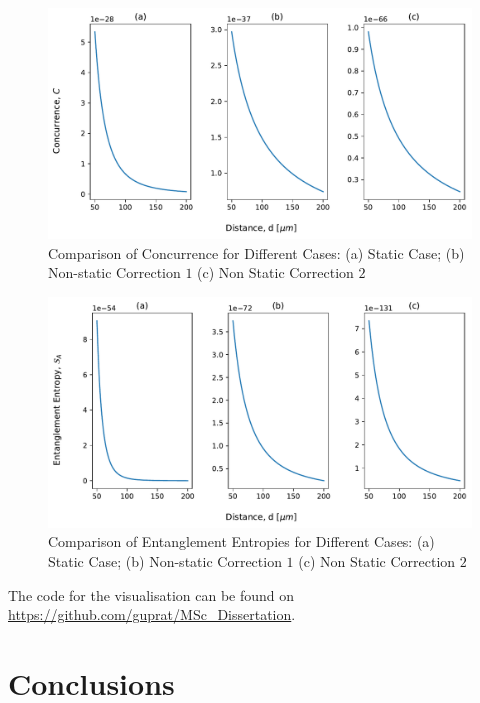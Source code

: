 \documentclass[12pt,a4paper]{report}
\theoremstyle{plain}
\theoremstyle{definition}
\theoremstyle{remark}
\begin{document}
\begin{figure}[htb]
    \centering
    \includegraphics[width=15cm]{ConcCases.pdf}
    \caption{Comparison of Concurrence for Different Cases:  (a) Static Case; (b) Non-static Correction $1$ (c) Non Static Correction $2$}
    \label{fig:Concurrence}
\end{figure}
\begin{figure}[htb]
    \centering
    \includegraphics[width=15cm]{EECases.pdf}
    \caption{Comparison of Entanglement Entropies for Different Cases:  (a) Static Case; (b) Non-static Correction $1$ (c) Non Static Correction $2$}
    \label{fig:EE2}
\end{figure}
The code for the visualisation can be found on \url{https://github.com/guprat/MSc_Dissertation}.
\newpage
\chapter{Conclusions}
\newpage

\newpage
\end{document}
